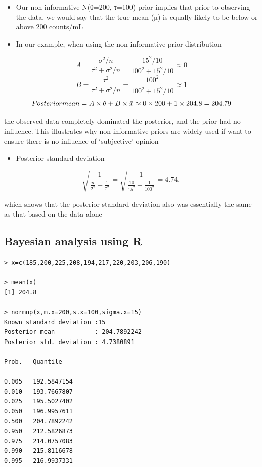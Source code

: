 \documentclass[
]{book}
\providecommand{\tightlist}{%
  \setlength{\itemsep}{0pt}\setlength{\parskip}{0pt}}
\begin{document}
\begin{itemize}
\tightlist
\item
  Our non-informative N(θ=200, τ=100) prior implies that prior to observing the data, we would say that the true mean (µ) is equally likely to be below or above 200 counts/mL
\item
  In our example, when using the non-informative prior distribution
\end{itemize}

\[A=\frac{\sigma^2/n}{\tau^2+\sigma^2/n}=\frac{15^2/10}{100^2+15^2/10}\approx 0\]
\[B = \frac{\tau^2}{\tau^2+\sigma^2/n}=\frac{100^2}{100^2+15^2/10}\approx 1\]
\[Posterior\space mean=A\times\theta+B\times\bar x\approx0\times 200+1\times204.8=204.79\]

the observed data completely dominated the posterior, and the prior had no influence. This illustrates why non-informative priors are widely used if want to ensure there is no influence of `subjective' opinion

\begin{itemize}
\tightlist
\item
  Posterior standard deviation
\end{itemize}

\[\sqrt{\frac{1}{\frac{n}{\sigma^2}+\frac{1}{\tau^2}}}=\sqrt{\frac{1}{\frac{10}{15^2}+\frac{1}{100^2}}}=4.74,\]

which shows that the posterior standard deviation also was essentially the same as that based on the data alone

\hypertarget{bayesian-analysis-using-r}{%
\subsection{Bayesian analysis using R}\label{bayesian-analysis-using-r}}

\begin{verbatim}
> x=c(185,200,225,208,194,217,220,203,206,190)

> mean(x)
[1] 204.8

> normnp(x,m.x=200,s.x=100,sigma.x=15)
Known standard deviation :15
Posterior mean           : 204.7892242
Posterior std. deviation : 4.7380891

Prob.   Quantile 
------  ----------
0.005   192.5847154
0.010   193.7667807
0.025   195.5027402
0.050   196.9957611
0.500   204.7892242
0.950   212.5826873
0.975   214.0757083
0.990   215.8116678
0.995   216.9937331
\end{verbatim}
\end{document}
